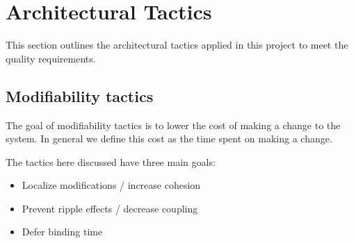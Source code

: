 \section{Architectural Tactics}
This section outlines the architectural tactics applied in this project to meet the quality requirements.

	\subsection{Modifiability tactics}
	The goal of modifiability tactics is to lower the cost of making a change to the system. In general we define this cost as the time spent on making a change.
	
	The tactics here discussed have three main goals:
	\begin{itemize}  
		\item Localize modifications / increase cohesion
		\item Prevent ripple effects / decrease coupling
		\item Defer binding time
	\end{itemize}
	

